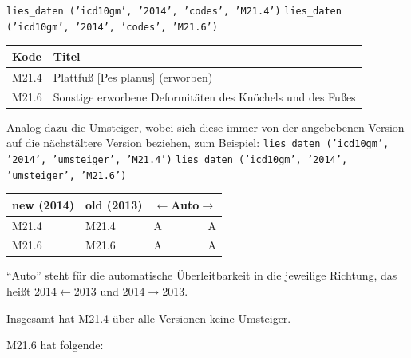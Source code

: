 \texttt{lies\_daten ('icd10gm', '2014', 'codes', 'M21.4')} \newline
\texttt{lies\_daten ('icd10gm', '2014', 'codes', 'M21.6')}

\begingroup
\renewcommand{\arraystretch}{1.2}
\setlength{\tabcolsep}{12pt}
\begin{tabular}{ll}
Kode & Titel \\
\hline
M21.4 & Plattfuß [Pes planus] (erworben) \\
M21.6 & Sonstige erworbene Deformitäten des Knöchels und des Fußes \\
\end{tabular}
\endgroup

Analog dazu die Umsteiger, wobei sich diese immer von der angebebenen Version auf die nächstältere Version beziehen, zum Beispiel: \newline
\texttt{lies\_daten ('icd10gm', '2014', 'umsteiger', 'M21.4')} \newline
\texttt{lies\_daten ('icd10gm', '2014', 'umsteiger', 'M21.6')}

\begingroup
\renewcommand{\arraystretch}{1.2}
\begin{tabular}{p{58pt}p{58pt}lr}
new (2014) & old (2013) & \multicolumn{2}{c}{$\leftarrow$Auto$\rightarrow$} \\
\hline
M21.4 & M21.4 & A & A \\
\hdashline[0.5pt/5pt]
M21.6 & M21.6 & A & A \\
\end{tabular}
\endgroup

``Auto'' steht für die automatische Überleitbarkeit in die jeweilige Richtung, das heißt 2014$\leftarrow$2013 und 2014$\rightarrow$2013.

Insgesamt hat M21.4 über alle Versionen keine Umsteiger.

M21.6 hat folgende:

